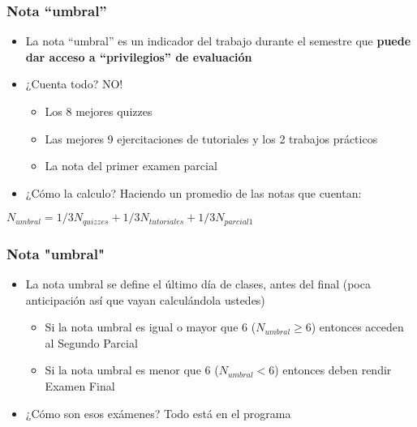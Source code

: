 \documentclass{beamer}
\begin{document}
\begin{frame}
    \frametitle{Nota ``umbral''}
    \begin{itemize}
        \item La nota ``umbral'' es un indicador del trabajo durante el semestre que \textbf{puede dar acceso a ``privilegios'' de evaluación} \vspace{2mm}
        \item ¿Cuenta todo? NO! \vspace{2mm}
        \begin{itemize}
            \item Los 8 mejores quizzes
            \item Las mejores 9 ejercitaciones de tutoriales y los 2 trabajos prácticos
            \item La nota del primer examen parcial
        \end{itemize} \vspace{2mm}
        \item ¿Cómo la calculo? Haciendo un promedio de las notas que cuentan:
    \end{itemize}
    \begin{center}
    $N_{umbral}=1/3N_{quizzes}+1/3N_{tutoriales}+1/3N_{parcial 1}$    
    \end{center}  
\end{frame}

\begin{frame}
    \frametitle{Nota "umbral"}
    \begin{itemize}
        \item La nota umbral se define el último día de clases, antes del final (poca anticipación así que vayan calculándola ustedes)
        \begin{itemize} \vspace{2mm}
            \item Si la nota umbral es igual o mayor que 6 ($N_{umbral} \geq 6$) entonces acceden al Segundo Parcial
            \item Si la nota umbral es menor que 6 ($N_{umbral} < 6$) entonces deben rendir Examen Final      
        \end{itemize} \vspace{2mm}   
        \item ¿Cómo son esos exámenes? Todo está en el programa
    \end{itemize}
\end{frame}
\end{document}
